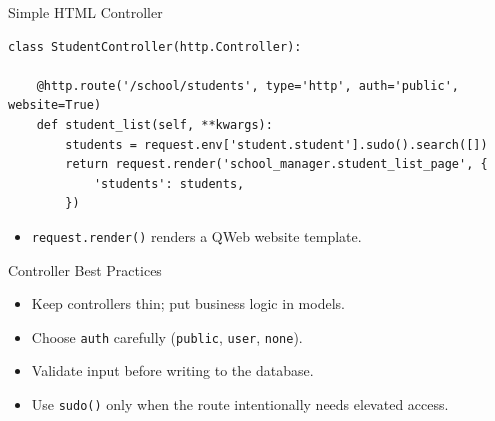\begin{frame}[fragile]{Simple HTML Controller}
\begin{lstlisting}
class StudentController(http.Controller):

	@http.route('/school/students', type='http', auth='public', website=True)
	def student_list(self, **kwargs):
		students = request.env['student.student'].sudo().search([])
		return request.render('school_manager.student_list_page', {
			'students': students,
		})
\end{lstlisting}
	\begin{itemize}
		\item \texttt{request.render()} renders a QWeb website template.
	\end{itemize}
\end{frame}

\begin{frame}{Controller Best Practices}
	\begin{itemize}
		\item Keep controllers thin; put business logic in models.
		\item Choose \texttt{auth} carefully (\texttt{public}, \texttt{user}, \texttt{none}).
		\item Validate input before writing to the database.
		\item Use \texttt{sudo()} only when the route intentionally needs elevated access.
	\end{itemize}
\end{frame}
